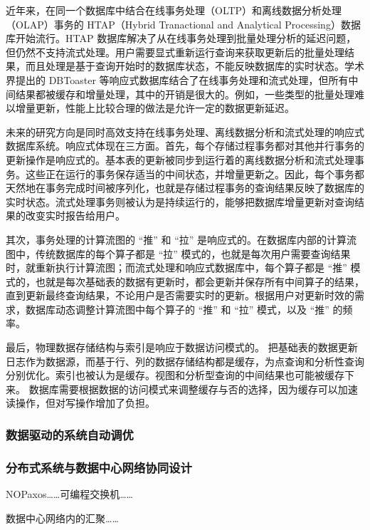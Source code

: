 近年来，在同一个数据库中结合在线事务处理（OLTP）和离线数据分析处理（OLAP）事务的 HTAP（Hybrid Tranactional and Analytical Processing）数据库开始流行。HTAP 数据库解决了从在线事务处理到批量处理分析的延迟问题，但仍然不支持流式处理。用户需要显式重新运行查询来获取更新后的批量处理结果，而且处理是基于查询开始时的数据库状态，不能反映数据库的实时状态。学术界提出的 DBToaster 等响应式数据库结合了在线事务处理和流式处理，但所有中间结果都被缓存和增量处理，其中的开销是很大的。例如，一些类型的批量处理难以增量更新，性能上比较合理的做法是允许一定的数据更新延迟。

未来的研究方向是同时高效支持在线事务处理、离线数据分析和流式处理的响应式数据库系统。响应式体现在三方面。首先，每个存储过程事务都对其他并行事务的更新操作是响应式的。基本表的更新被同步到运行着的离线数据分析和流式处理事务。这些正在运行的事务保存适当的中间状态，并增量更新之。因此，每个事务都天然地在事务完成时间被序列化，也就是存储过程事务的查询结果反映了数据库的实时状态。流式处理事务则被认为是持续运行的，能够把数据库增量更新对查询结果的改变实时报告给用户。

其次，事务处理的计算流图的 ``推'' 和 ``拉'' 是响应式的。在数据库内部的计算流图中，传统数据库的每个算子都是 ``拉'' 模式的，也就是每次用户需要查询结果时，就重新执行计算流图；而流式处理和响应式数据库中，每个算子都是 ``推'' 模式的，也就是每次基础表的数据有更新时，都会更新并保存所有中间算子的结果，直到更新最终查询结果，不论用户是否需要实时的更新。根据用户对更新时效的需求，数据库动态调整计算流图中每个算子的 ``推'' 和 ``拉'' 模式，以及 ``推'' 的频率。

最后，物理数据存储结构与索引是响应于数据访问模式的。
把基础表的数据更新日志作为数据源，而基于行、列的数据存储结构都是缓存，为点查询和分析性查询分别优化。索引也被认为是缓存。视图和分析型查询的中间结果也可能被缓存下来。
数据库需要根据数据的访问模式来调整缓存与否的选择，因为缓存可以加速读操作，但对写操作增加了负担。

\subsubsection{数据驱动的系统自动调优}
\label{future:data-driven-system}


\subsubsection{分布式系统与数据中心网络协同设计}
\label{future:system-network-codesign}

NOPaxos……可编程交换机……

数据中心网络内的汇聚……


